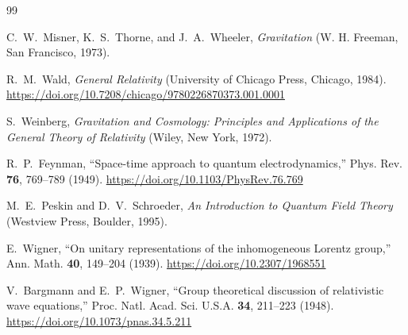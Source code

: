\documentclass[%
 reprint,
 amsmath,amssymb,
 aps,
 prb,
]{revtex4-2}
\numberwithin{equation}{section}
\begin{document}
\begin{thebibliography}{99}

C.~W.~Misner, K.~S.~Thorne, and J.~A.~Wheeler,
\textit{Gravitation}
(W. H. Freeman, San Francisco, 1973).

R.~M.~Wald,
\textit{General Relativity}
(University of Chicago Press, Chicago, 1984).
\href{https://doi.org/10.7208/chicago/9780226870373.001.0001}{https://doi.org/10.7208/chicago/9780226870373.001.0001}

S.~Weinberg,
\textit{Gravitation and Cosmology: Principles and Applications of the General Theory of Relativity}
(Wiley, New York, 1972).

R.~P.~Feynman,
``Space-time approach to quantum electrodynamics,''
Phys. Rev. \textbf{76}, 769--789 (1949).
\href{https://doi.org/10.1103/PhysRev.76.769}{https://doi.org/10.1103/PhysRev.76.769}

M.~E.~Peskin and D.~V.~Schroeder,
\textit{An Introduction to Quantum Field Theory}
(Westview Press, Boulder, 1995).

E.~Wigner,
``On unitary representations of the inhomogeneous Lorentz group,''
Ann. Math. \textbf{40}, 149--204 (1939).
\href{https://doi.org/10.2307/1968551}{https://doi.org/10.2307/1968551}

V.~Bargmann and E.~P.~Wigner,
``Group theoretical discussion of relativistic wave equations,''
Proc. Natl. Acad. Sci. U.S.A. \textbf{34}, 211--223 (1948).
\href{https://doi.org/10.1073/pnas.34.5.211}{https://doi.org/10.1073/pnas.34.5.211}


\end{thebibliography}
\end{document}

